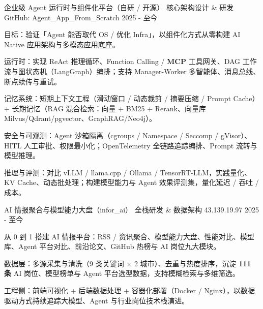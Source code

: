 
\begin{cventries}

  \cventry
    {企业级 Agent 运行时与组件化平台（自研 / 开源）} %
    {核心架构设计 \& 研发} %
    {GitHub: Agent\_App\_From\_Scratch} %
    {2025 - 至今} %
    {
      \begin{cvitems}
        \item {目标：验证「Agent 能否取代 OS / 优化 Infra」，以组件化方式从零构建 AI Native 应用架构与多模态应用底座。}
        \item {运行时：实现 ReAct 推理循环、Function Calling / \textbf{MCP} 工具网关、DAG 工作流与图状态机（LangGraph）编排；支持 Manager-Worker 多智能体、消息总线、断点续传与重试。}
        \item {记忆系统：短期上下文工程（滑动窗口 / 动态裁剪 / 摘要压缩 / Prompt Cache）+ 长期记忆（RAG 混合检索：向量 + BM25 + Rerank、向量库 Milvus/Qdrant/pgvector、GraphRAG/Neo4j）。}
        \item {安全与可观测：Agent 沙箱隔离（cgroups / Namespace / Seccomp / gVisor）、HITL 人工审批、权限最小化；OpenTelemetry 全链路追踪编排、Prompt 流转与模型推理。}
        \item {推理与评测：对比 vLLM / llama.cpp / Ollama / TensorRT-LLM，实践量化、KV Cache、动态批处理；构建模型能力与 Agent 效果评测集，量化延迟 / 吞吐 / 成本。}
      \end{cvitems}
    }

  \vspace{2.5mm}
  \cventry
    {AI 情报聚合与模型能力大盘（infor\_ai）}
    {全栈研发 \& 数据架构}
    {43.139.19.97} %
    {2025 - 至今} %
    {
      \begin{cvitems}
        \item {从 0 到 1 搭建 AI 情报平台：RSS / 资讯聚合、模型能力大盘、性能对比、模型库、Agent 平台对比、前沿论文、GitHub 热榜与 AI 岗位九大模块。}
        \item {数据层：多源采集与清洗（9 类关键词 × 2 城市）、去重与热度排序，沉淀 \textbf{111 条} AI 岗位、模型榜单与 Agent 平台选型数据，支持模糊检索与多维筛选。}
        \item {工程侧：前端可视化 + 后端数据处理 + 容器化部署（Docker / Nginx），以数据驱动方式持续追踪大模型、Agent 与行业岗位技术栈演进。}
      \end{cvitems}
    }


\end{cventries}

